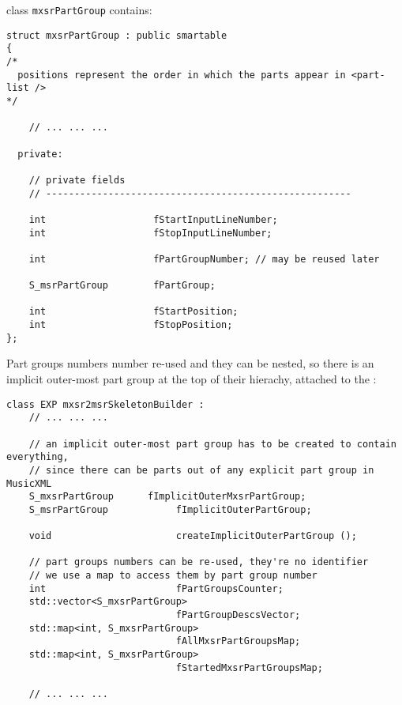 class   {\tt mxsrPartGroup} contains:
\begin{lstlisting}[language=CPlusPlus]
struct mxsrPartGroup : public smartable
{
/*
  positions represent the order in which the parts appear in <part-list />
*/

	// ... ... ...

  private:

    // private fields
    // ------------------------------------------------------

    int                   fStartInputLineNumber;
    int                   fStopInputLineNumber;

    int                   fPartGroupNumber; // may be reused later

    S_msrPartGroup        fPartGroup;

    int                   fStartPosition;
    int                   fStopPosition;
};
\end{lstlisting}

Part groups numbers number re-used and they can be nested, so there is an implicit outer-most part group at the top of their hierachy, attached to the :
\begin{lstlisting}[language=CPlusPlus]
class EXP mxsr2msrSkeletonBuilder :
	// ... ... ...

    // an implicit outer-most part group has to be created to contain everything,
    // since there can be parts out of any explicit part group in MusicXML
    S_mxsrPartGroup      fImplicitOuterMxsrPartGroup;
    S_msrPartGroup            fImplicitOuterPartGroup;

    void                      createImplicitOuterPartGroup ();

    // part groups numbers can be re-used, they're no identifier
    // we use a map to access them by part group number
    int                       fPartGroupsCounter;
    std::vector<S_mxsrPartGroup>
                              fPartGroupDescsVector;
    std::map<int, S_mxsrPartGroup>
                              fAllMxsrPartGroupsMap;
    std::map<int, S_mxsrPartGroup>
                              fStartedMxsrPartGroupsMap;

	// ... ... ...
\end{lstlisting}

